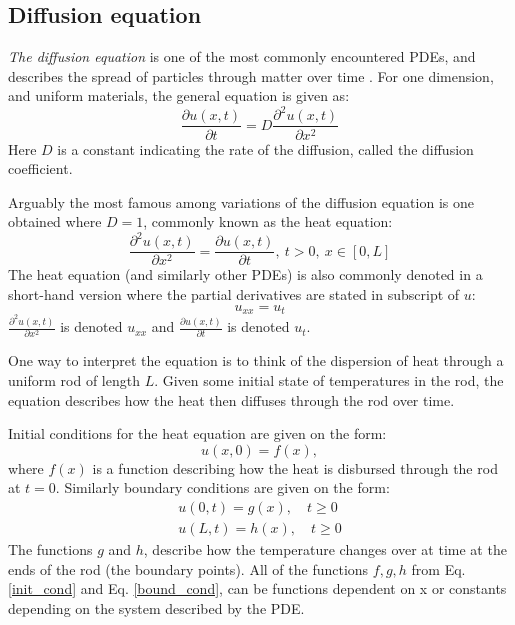 \subsection{Diffusion equation}
\textit{The diffusion equation} is one of the most commonly encountered PDEs, and describes the spread of particles through matter over time \citep[p. 18]{tveitoPDE}. For one dimension, and uniform materials, the general equation is given as:
\begin{equation}
    \frac{\partial u(x,t)}{\partial t} = D \frac{\partial^2 u(x,t)}{\partial x^2}
\end{equation}
Here $D$ is a constant indicating the rate of the diffusion, called the diffusion coefficient. 

Arguably the most famous among variations of the diffusion equation is one obtained where $D=1$, commonly known as the heat equation:
\begin{equation}\label{eq:diffu}
    \frac{\partial^2 u(x,t)}{\partial x^2}  =\frac{\partial u(x,t)}{\partial t}, \ t>0, \ x\in [0, L]
\end{equation}
The heat equation (and similarly other PDEs) is also commonly denoted in a short-hand version where the partial derivatives are stated in subscript of $u$:  
\begin{equation}
    u_{xx} = u_t
\end{equation}
$\frac{\partial^2 u(x,t)}{\partial x^2}$ is denoted $u_{xx}$ and $\frac{\partial u(x,t)}{\partial t}$ is denoted $u_t$.

One way to interpret the equation is to think of the dispersion of heat through a uniform rod of length $L$. Given some initial state of temperatures in the rod, the equation describes how the heat then diffuses through the rod over time. 

Initial conditions for the heat equation are given on the form: 
\begin{equation}\label{init_cond}
    u(x,0) = f(x),
\end{equation}
where $f(x)$ is a function describing how the heat is disbursed through the rod at $t=0$.
Similarly boundary conditions are given on the form: 
\begin{equation}\label{bound_cond}
    \begin{split}
        u(0, t) = g(x), \quad t \ge 0 \\
        u(L, t) = h(x), \quad t \ge 0
    \end{split}
\end{equation}
The functions $g$ and $h$, describe how the temperature changes over at time at the ends of the rod (the boundary points). 
All of the functions $f, g, h$ from Eq. \ref{init_cond} and Eq. \ref{bound_cond}, can be functions dependent on x or constants depending on the system described by the PDE. 

